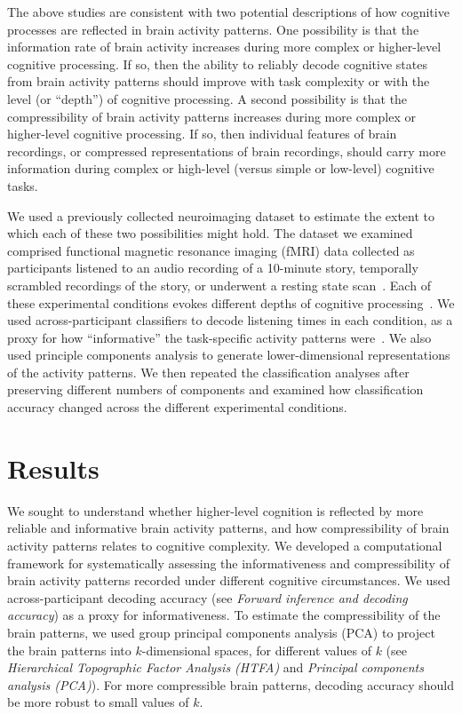 \documentclass[english, 11pt]{article}
\begin{document}
The above studies are consistent with two potential descriptions of how
cognitive processes are reflected in brain activity patterns. One possibility
is that the information rate of brain activity increases during more complex or
higher-level cognitive processing. If so, then the ability to reliably decode
cognitive states from brain activity patterns should improve with task
complexity or with the level (or ``depth'') of cognitive processing. A second
possibility is that the compressibility of brain activity patterns increases
during more complex or higher-level cognitive processing. If so, then
individual features of brain recordings, or compressed representations of brain
recordings, should carry more information during complex or high-level (versus
simple or low-level) cognitive tasks.

We used a previously collected neuroimaging dataset to estimate the extent to
which each of these two possibilities might hold. The dataset we examined
comprised functional magnetic resonance imaging (fMRI) data collected as
participants listened to an audio recording of a 10-minute story, temporally
scrambled recordings of the story, or underwent a resting state
scan~\citep{SimoEtal16}. Each of these experimental conditions evokes different
depths of cognitive processing~\citep{SimoEtal16,LernEtal11,
HassEtal08,OwenEtal21}. We used across-participant classifiers to decode
listening times in each condition, as a proxy for how ``informative'' the
task-specific activity patterns were~\citep{SimoChan20}. We also used principle
components analysis to generate lower-dimensional representations of the
activity patterns. We then repeated the classification analyses after
preserving different numbers of components and examined how classification
accuracy changed across the different experimental conditions.



\section*{Results}

We sought to understand whether higher-level cognition is reflected by more
reliable and informative brain activity patterns, and how compressibility of
brain activity patterns relates to cognitive complexity. We developed a
computational framework for systematically assessing the informativeness and
compressibility of brain activity patterns recorded under different cognitive
circumstances. We used across-participant decoding accuracy (see
\textit{Forward inference and decoding accuracy}) as a proxy for
informativeness. To estimate the compressibility of the brain patterns, we used
group principal components analysis (PCA) to project the brain patterns into
$k$-dimensional spaces, for different values of $k$ (see \textit{Hierarchical
Topographic Factor Analysis (HTFA)} and \textit{Principal components analysis
(PCA)}). For more compressible brain patterns, decoding accuracy should be more
robust to small values of $k$.
\end{document}
